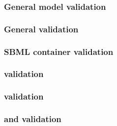 \begin{sbmlenum}

\end{sbmlenum} \subsubsection*{General model validation} \begin{sbmlenum}


\end{sbmlenum} \subsubsection*{General  validation} \begin{sbmlenum}


\end{sbmlenum} \subsubsection*{SBML container validation} \begin{sbmlenum}


\end{sbmlenum} \subsubsection*{ validation} \begin{sbmlenum}


\end{sbmlenum} \subsubsection*{ validation} \begin{sbmlenum}


\end{sbmlenum} \subsubsection*{ and  validation} \begin{sbmlenum}


\end{sbmlenum}
